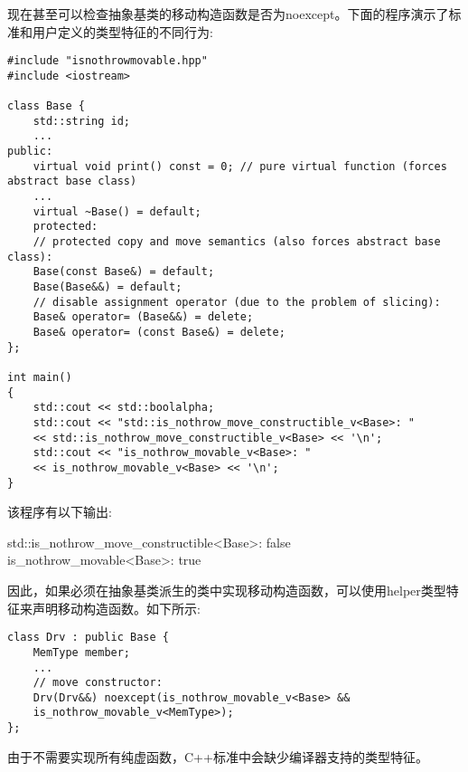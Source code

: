 现在甚至可以检查抽象基类的移动构造函数是否为noexcept。下面的程序演示了标准和用户定义的类型特征的不同行为:\par

{\color{red}{poly/isnothrowmovable.cpp}}\par

\begin{lstlisting}[caption={}]
#include "isnothrowmovable.hpp"
#include <iostream>

class Base {
	std::string id;
	...
public:
	virtual void print() const = 0; // pure virtual function (forces abstract base class)
	...
	virtual ~Base() = default;
	protected:
	// protected copy and move semantics (also forces abstract base class):
	Base(const Base&) = default;
	Base(Base&&) = default;
	// disable assignment operator (due to the problem of slicing):
	Base& operator= (Base&&) = delete;
	Base& operator= (const Base&) = delete;
};

int main()
{
	std::cout << std::boolalpha;
	std::cout << "std::is_nothrow_move_constructible_v<Base>: "
	<< std::is_nothrow_move_constructible_v<Base> << '\n';
	std::cout << "is_nothrow_movable_v<Base>: "
	<< is_nothrow_movable_v<Base> << '\n';
}
\end{lstlisting}

该程序有以下输出:\par

\begin{tcolorbox}[colback=white,colframe=black]
std::is\_nothrow\_move\_constructible<Base>: false \\
is\_nothrow\_movable<Base>: true
\end{tcolorbox}

因此，如果必须在抽象基类派生的类中实现移动构造函数，可以使用helper类型特征来声明移动构造函数。如下所示:\par

\begin{lstlisting}[caption={}]
class Drv : public Base {
	MemType member;
	...
	// move constructor:
	Drv(Drv&&) noexcept(is_nothrow_movable_v<Base> &&
	is_nothrow_movable_v<MemType>);
};
\end{lstlisting}

由于不需要实现所有纯虚函数，C++标准中会缺少编译器支持的类型特征。\par



























